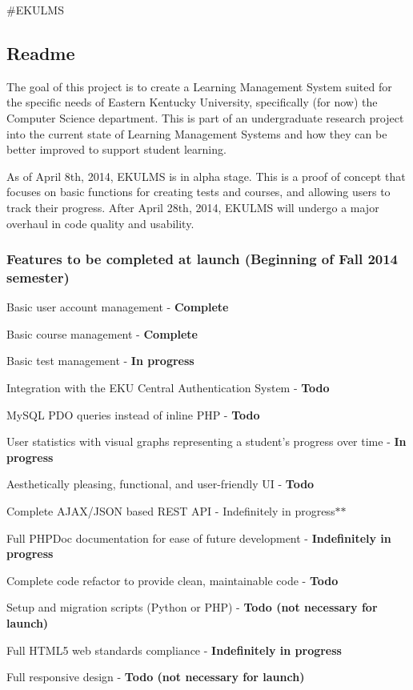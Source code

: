 \#\-E\-K\-U\-L\-M\-S

\subsection*{Readme}

The goal of this project is to create a Learning Management System suited for the specific needs of Eastern Kentucky University, specifically (for now) the Computer Science department. This is part of an undergraduate research project into the current state of Learning Management Systems and how they can be better improved to support student learning.

As of April 8th, 2014, E\-K\-U\-L\-M\-S is in alpha stage. This is a proof of concept that focuses on basic functions for creating tests and courses, and allowing users to track their progress. After April 28th, 2014, E\-K\-U\-L\-M\-S will undergo a major overhaul in code quality and usability.

\subsubsection*{Features to be completed at launch (Beginning of Fall 2014 semester)}


\begin{DoxyItemize}
\item Basic user account management -\/ {\bfseries Complete}
\item Basic course management -\/ {\bfseries Complete}
\item Basic test management -\/ {\bfseries In progress}
\item Integration with the E\-K\-U Central Authentication System -\/ {\bfseries Todo}
\item My\-S\-Q\-L P\-D\-O queries instead of inline P\-H\-P -\/ {\bfseries Todo}
\item User statistics with visual graphs representing a student's progress over time -\/ {\bfseries In progress}
\item Aesthetically pleasing, functional, and user-\/friendly U\-I -\/ {\bfseries Todo}
\item Complete A\-J\-A\-X/\-J\-S\-O\-N based R\-E\-S\-T A\-P\-I -\/ Indefinitely in progress$\ast$$\ast$
\item Full P\-H\-P\-Doc documentation for ease of future development -\/ {\bfseries Indefinitely in progress}
\item Complete code refactor to provide clean, maintainable code -\/ {\bfseries Todo}
\item Setup and migration scripts (Python or P\-H\-P) -\/ {\bfseries Todo (not necessary for launch)}
\item Full H\-T\-M\-L5 web standards compliance -\/ {\bfseries Indefinitely in progress}
\item Full responsive design -\/ {\bfseries Todo (not necessary for launch)}
\end{DoxyItemize}

